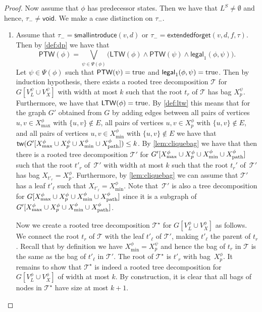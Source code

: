 \documentclass[a4paper,UKenglish,cleveref, autoref, thm-restate, numberwithinsect]{lipics-v2021}
\newcommand{\tw}{\mathsf{tw}}
\newcommand{\smallintroduce}{\mathsf{smallintroduce}}
\newcommand{\extendedforget}{\mathsf{extendedforget}}
\newcommand{\void}{\mathsf{void}}
\newcommand{\ptw}{\mathsf{PTW}}
\newcommand{\ltw}{\mathsf{LTW}}
\newcommand{\legal}{\mathsf{legal}}
\newcommand{\dpath}{\textup{path}}
\newcommand{\true}{\textup{true}}
\begin{document}
\begin{proof}
Now assume that $\phi$ has predecessor states. Then we have that $L^S\neq \emptyset$ and hence, $\tau_-\neq\void$. We make a case distinction on $\tau_-$.
\begin{enumerate}
\item Assume that $\tau_-=\smallintroduce(v,d)$ or $\tau_-=\extendedforget(v,d,f,\tau)$. 
Then by \cref{def:dp} we have that 
        \[
        \ptw(\phi) = \bigvee_{\psi\in\Psi(\phi)} \bigl(\ltw(\phi)\wedge\ptw(\psi)\wedge\legal_1(\phi,\psi)\bigr).
        \]
Let $\psi\in\Psi(\phi)$ such that $\ptw(\psi)=\true$ and $\legal_1(\phi,\psi)=\true$. 
Then by induction hypothesis, there exists a rooted tree decomposition $\mathcal{T}$ for $G[V^\psi_L\cup V^\psi_X]$ with width at most $k$ such that the root $t_r$ of $\mathcal{T}$ has bag $X^\psi_p$. 
Furthermore, we have that $\ltw(\phi)=\true$. 
By \cref{def:ltw} this means that for the graph $G'$ obtained from $G$ by adding edges between all pairs of vertices $u,v\in  X^\phi_{\max}$ with $\{u,v\}\notin E$,  all pairs of vertices $u,v\in  X^\phi_p$ with $\{u,v\}\notin E$, and all pairs of vertices $u,v\in X^\phi_{\min}$ with $\{u,v\}\notin E$ we have that $\tw(G'[X^\phi_{\max}\cup X^\phi_p\cup X^\phi_{\min}\cup X^\phi_{\dpath}])\le k$.
By \cref{lem:cliquebag} we have that then there is a rooted tree decomposition $\mathcal{T}'$ for $G'[X^\phi_{\max}\cup X^\phi_p\cup X^\phi_{\min}\cup X^\phi_{\dpath}]$ such that the root $t'_r$ of~$\mathcal{T}'$ with width at most $k$ such that the root $t_r'$ of~$\mathcal{T}'$ has bag $X_{t'_r}=X^\phi_p$.
Furthermore, by \cref{lem:cliquebag} we can assume that $\mathcal{T}'$ has a leaf $t'_\ell$ such that $X_{t'_\ell}=X^\phi_{\min}$.
Note that~$\mathcal{T}'$ is also a tree decomposition for $G[X^\phi_{\max}\cup X^\phi_p\cup X^\phi_{\min}\cup X^\phi_{\dpath}]$ since it is a subgraph of $G'[X^\phi_{\max}\cup X^\phi_p\cup X^\phi_{\min}\cup X^\phi_{\dpath}]$. 

Now we create a rooted tree decomposition $\mathcal{T}^\star$ for $G[V^\phi_L\cup V^\phi_X]$ as follows. 
We connect the root $t_r$ of $\mathcal{T}$ with the leaf $t'_\ell$ of $\mathcal{T}'$, making $t'_\ell$ the parent of $t_r$. Recall that by definition we have $X^\phi_{\min}=X^\psi_p$ and hence the bag of $t_r$ in $\mathcal{T}$ is the same as the bag of $t'_\ell$ in $\mathcal{T}'$. The root of $\mathcal{T}^\star$ is $t'_r$ with bag~$X^\phi_p$.
It remains to show that $\mathcal{T}^\star$ is indeed a rooted tree decomposition for $G[V^\phi_L\cup V^\phi_X]$ of width at most $k$. By construction, it is clear that all bags of nodes in $\mathcal{T}^\star$ have size at most $k+1$. 


\end{enumerate}
\end{proof}
\end{document}
